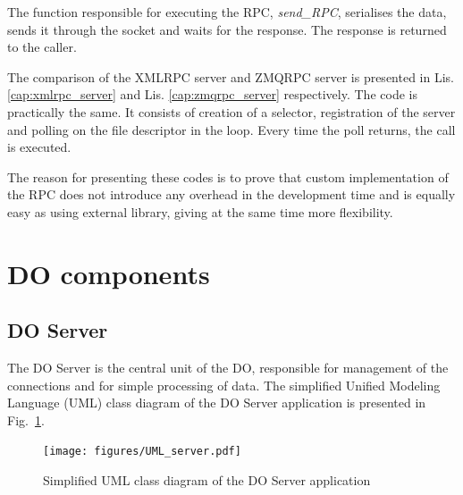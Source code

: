     The function responsible for executing the RPC, \textit{send\_RPC}, serialises the data, sends it through the socket and waits for the response. The response is returned to the caller.  
    
    The comparison of the XMLRPC server and ZMQRPC server is presented in Lis. \ref{cap:xmlrpc_server} and Lis. \ref{cap:zmqrpc_server} respectively. The code is practically the same. It consists of creation of a selector, registration of the server and polling on the file descriptor in the loop. Every time the poll returns, the call is executed.
    
    The reason for presenting these codes is to prove that custom implementation of the RPC does not introduce any overhead in the development time and is equally easy as using external library, giving at the same time more flexibility.
    
    
    
    
    
\section{DO components} \label{section:do_components}

    \subsection{DO Server} \label{section:do_server_app}
        The DO Server is the central unit of the DO, responsible for management of the connections and for simple processing of data. 
        The simplified Unified Modeling Language (UML) class diagram of the DO Server application is presented in Fig.~\ref{fig:uml_server}.
        
        \begin{figure}
        	\centerline{\texttt{[image: figures/UML\_server.pdf]}}
        	\caption{Simplified UML class diagram of the DO Server application}
        	\label{fig:uml_server}
        \end{figure}
        
